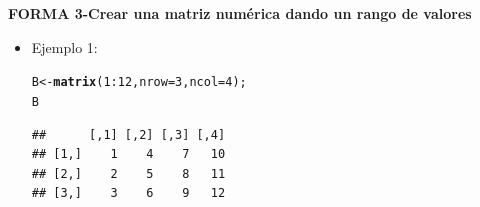 \documentclass[12pt,letterpaper]{article}\usepackage[]{graphicx}\usepackage[]{color}
\makeatletter
\newcommand{\hlnum}[1]{\textcolor[rgb]{0.686,0.059,0.569}{#1}}%
\newcommand{\hlopt}[1]{\textcolor[rgb]{0,0,0}{#1}}%
\newcommand{\hlstd}[1]{\textcolor[rgb]{0.345,0.345,0.345}{#1}}%
\newcommand{\hlkwb}[1]{\textcolor[rgb]{0.69,0.353,0.396}{#1}}%
\newcommand{\hlkwc}[1]{\textcolor[rgb]{0.333,0.667,0.333}{#1}}%
\newcommand{\hlkwd}[1]{\textcolor[rgb]{0.737,0.353,0.396}{\textbf{#1}}}%
\newenvironment{kframe}{%
 \def\at@end@of@kframe{}%
 \ifinner\ifhmode%
  \def\at@end@of@kframe{\end{minipage}}%
  \begin{minipage}{\columnwidth}%
 \fi\fi%
 \def\FrameCommand##1{\hskip\@totalleftmargin \hskip-\fboxsep
 \colorbox{shadecolor}{##1}\hskip-\fboxsep
     \hskip-\linewidth \hskip-\@totalleftmargin \hskip\columnwidth}%
 \MakeFramed {\advance\hsize-\width
   \@totalleftmargin\z@ \linewidth\hsize
   \@setminipage}}%
 {\par\unskip\endMakeFramed%
 \at@end@of@kframe}
\newenvironment{knitrout}{}{} %
\makeatother
\begin{document}
\textbf {FORMA 3-Crear una matriz num\'erica dando un rango de valores}
\begin{itemize}
\item Ejemplo 1:
\begin{knitrout}
\color{fgcolor}\begin{kframe}
\begin{alltt}
\hlstd{B} \hlkwb{<-} \hlkwd{matrix}\hlstd{(}\hlnum{1}\hlopt{:}\hlnum{12}\hlstd{,} \hlkwc{nrow}\hlstd{=}\hlnum{3}\hlstd{,} \hlkwc{ncol}\hlstd{=}\hlnum{4}\hlstd{);}
\hlstd{B}
\end{alltt}
\begin{verbatim}
##      [,1] [,2] [,3] [,4]
## [1,]    1    4    7   10
## [2,]    2    5    8   11
## [3,]    3    6    9   12
\end{verbatim}
\end{kframe}
\end{knitrout}
\end{itemize}
\end{document}
